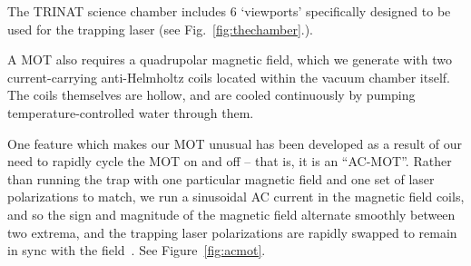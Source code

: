 
The TRINAT science chamber includes 6 `viewports' specifically designed to be used for the trapping laser (see Fig.~\ref{fig:thechamber}.).




A MOT also requires a quadrupolar magnetic field, which we generate with two current-carrying anti-Helmholtz coils located within the vacuum chamber itself.  The coils themselves are hollow, and are cooled continuously by pumping temperature-controlled water through them.   

One feature which makes our MOT unusual has been developed as a result of our need to rapidly cycle the MOT on and off -- that is, it is an ``AC-MOT''.  Rather than running the trap with one particular magnetic field and one set of laser polarizations to match, we run a sinusoidal AC current in the magnetic field coils, and so the sign and magnitude of the magnetic field alternate smoothly between two extrema, and the trapping laser polarizations are rapidly swapped to remain in sync with the field~\cite{harveymurray}\cite{thesis}.  See Figure~\ref{fig:acmot}.  

